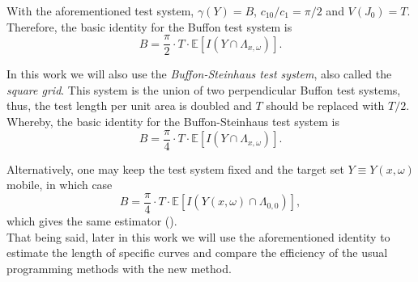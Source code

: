 With the aforementioned test system, $\gamma(Y)=B$, $c_{10}/c_1=\pi/2$ and $V(J_0)=T$. Therefore, the basic identity for the Buffon test system is
\begin{equation} \label{Buffon}
    B=\frac{\pi}{2}\cdot T \cdot \mathbb{E}[I(Y\cap \Lambda_{x,\omega})].
\end{equation}

In this work we will also use the \textit{Buffon-Steinhaus test system}, also called the \textit{square grid}. This system is the union of two perpendicular Buffon test systems, thus, the test length per unit area is doubled and $T$ should be replaced with $T/2$. Whereby, the basic identity for the Buffon-Steinhaus test system is
\begin{equation} \label{Buffon_Steinhaus}
    B = \frac{\pi}{4} \cdot T \cdot \mathbb{E}[I(Y\cap \Lambda_{x,\omega})].
\end{equation}

Alternatively, one may keep the test system fixed and the target set $Y\equiv Y(x,\omega)$ mobile, in which case
\begin{equation*}
    B = \frac{\pi}{4} \cdot T \cdot \mathbb{E}[I(Y(x,\omega) \cap \Lambda_{0,0})],
\end{equation*}
which gives the same estimator (\cite{SterThAppl-2022-07-21.pdf}).\\

That being said, later in this work we will use the aforementioned identity to estimate the length of specific curves and compare the efficiency of the usual programming methods with the new method.\\


